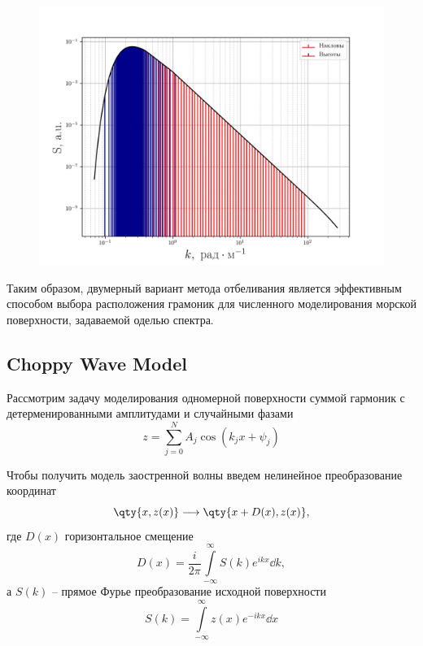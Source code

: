 \begin{figure}[ht]
    \centering
    \includegraphics[width=0.6\linewidth]{fig/fig3}
    \caption{}
    \label{fig:}
\end{figure}

Таким образом, двумерный вариант метода отбеливания является эффективным
способом выбора расположения грамоник для численного моделирования морской
поверхности, задаваемой оделью спектра.




\subsection{Choppy Wave Model}

Рассмотрим задачу моделирования одномерной поверхности суммой гармоник 
 с детерменированными амплитудами и случайными фазами
 \begin{equation}
     z = \sum\limits_{j=0}^{N} A_j \cos(k_j x + \psi_j)
 \end{equation}

Чтобы получить модель заостренной волны введем нелинейное преобразование координат
\begin{equation}
    \qty{x,z(x)} \longrightarrow \qty{x + D(x),z(x)},
\end{equation}
где $D(x)$ горизонтальное смещение
\begin{equation}
    D(x) =  \frac{i}{2\pi} \int\limits_{-\infty}^{\infty}   S(k) e^{ikx} \dd{k},
\end{equation}
а $S(k)$ -- прямое Фурье преобразование исходной поверхности
\begin{equation}
    S(k) = \int\limits_{-\infty}^{\infty} z(x) e^{-ikx} \dd x 
\end{equation}

